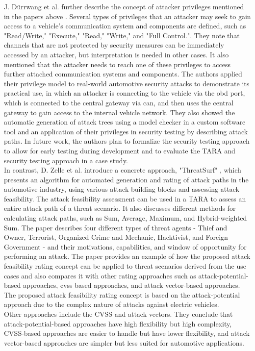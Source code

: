 J. Dürrwang et al. further describe the concept of attacker privileges mentioned in the papers above \cite{attacker_privileges}.
Several types of privileges that an attacker may seek to gain access to a vehicle's communication system and components are defined, such as "Read/Write," "Execute," "Read," "Write," and "Full Control.".
They note that channels that are not protected by security measures can be immediately accessed by an attacker, but interpretation is needed in other cases. 
It also mentioned that the attacker needs to reach one of these privileges to access further attached communication systems and components.
The authors applied their privilege model to real-world automotive security attacks to demonstrate its practical use, in which
an attacker is connecting to the vehicle via the \gls{obd} port, which is connected to the central gateway via \gls{can}, and then uses the central gateway to gain access to the internal vehicle network.
They also showed the automatic generation of attack trees using a model checker in a custom software tool and an application of their privileges in security testing by describing attack paths. 
In future work, the authors plan to formalize the security testing approach to allow for early testing during development and to evaluate the TARA and security testing approach in a case study.\\

In contrast, D. Zelle et al. introduce a concrete approach, "ThreatSurf" \cite{threat_surf}, which presents an algorithm for automated generation and rating of 
attack paths in the automotive industry, using various attack building blocks and assessing attack feasibility.
The attack feasibility assessment can be used in a TARA to assess an entire attack path of a threat scenario.
It also discusses different methods for calculating attack paths, such as Sum, Average, Maximum, and Hybrid-weighted Sum. 
The paper describes four different types of threat agents - Thief and Owner, Terrorist, Organized Crime and Mechanic, Hacktivist, and Foreign Government - 
and their motivations, capabilities, and window of opportunity for performing an attack. 
The paper provides an example of how the proposed attack feasibility rating concept can be applied to threat scenarios derived from the use cases and also 
compares it with other rating approaches such as attack-potential-based approaches, \gls{cvss} based approaches, and attack vector-based approaches.
The proposed attack feasibility rating concept is based on the attack-potential approach due to the complex nature of attacks against electric vehicles.\\
Other approaches include the CVSS and attack vectors.
They conclude that attack-potential-based approaches have high flexibility but high complexity, 
CVSS-based approaches are easier to handle but have lower flexibility, and attack vector-based approaches are simpler but less suited for automotive applications.\\


